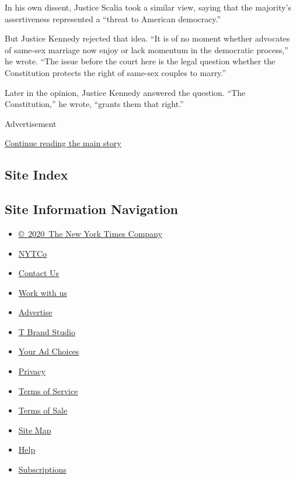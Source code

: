 In his own dissent, Justice Scalia took a similar view, saying that the
majority's assertiveness represented a ``threat to American democracy.''

But Justice Kennedy rejected that idea. ``It is of no moment whether
advocates of same-sex marriage now enjoy or lack momentum in the
democratic process,'' he wrote. ``The issue before the court here is the
legal question whether the Constitution protects the right of same-sex
couples to marry.''

Later in the opinion, Justice Kennedy answered the question. ``The
Constitution,'' he wrote, ``grants them that right.''

Advertisement

\protect\hyperlink{after-bottom}{Continue reading the main story}

\hypertarget{site-index}{%
\subsection{Site Index}\label{site-index}}

\hypertarget{site-information-navigation}{%
\subsection{Site Information
Navigation}\label{site-information-navigation}}

\begin{itemize}
\tightlist
\item
  \href{https://help.nytimes.com/hc/en-us/articles/115014792127-Copyright-notice}{©~2020~The
  New York Times Company}
\end{itemize}

\begin{itemize}
\tightlist
\item
  \href{https://www.nytco.com/}{NYTCo}
\item
  \href{https://help.nytimes.com/hc/en-us/articles/115015385887-Contact-Us}{Contact
  Us}
\item
  \href{https://www.nytco.com/careers/}{Work with us}
\item
  \href{https://nytmediakit.com/}{Advertise}
\item
  \href{http://www.tbrandstudio.com/}{T Brand Studio}
\item
  \href{https://www.nytimes.com/privacy/cookie-policy\#how-do-i-manage-trackers}{Your
  Ad Choices}
\item
  \href{https://www.nytimes.com/privacy}{Privacy}
\item
  \href{https://help.nytimes.com/hc/en-us/articles/115014893428-Terms-of-service}{Terms
  of Service}
\item
  \href{https://help.nytimes.com/hc/en-us/articles/115014893968-Terms-of-sale}{Terms
  of Sale}
\item
  \href{https://spiderbites.nytimes.com}{Site Map}
\item
  \href{https://help.nytimes.com/hc/en-us}{Help}
\item
  \href{https://www.nytimes.com/subscription?campaignId=37WXW}{Subscriptions}
\end{itemize}
